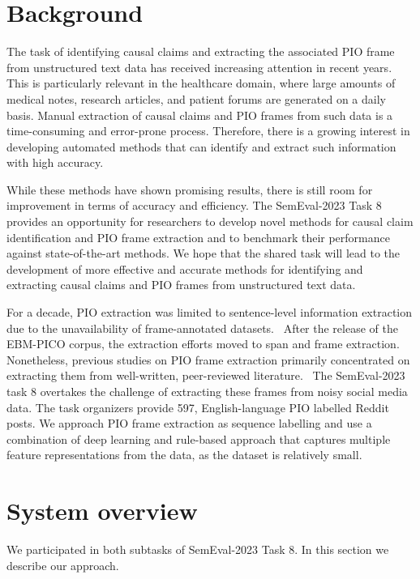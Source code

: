 \documentclass[11pt]{article}
\begin{document}
\section{Background}
\label{background}
%
The task of identifying causal claims and extracting the associated PIO frame from unstructured text data has received increasing attention in recent years.
This is particularly relevant in the healthcare domain, where large amounts of medical notes, research articles, and patient forums are generated on a daily basis.
Manual extraction of causal claims and PIO frames from such data is a time-consuming and error-prone process. Therefore, there is a growing interest in developing automated methods that can identify and extract such information with high accuracy.

While these methods have shown promising results, there is still room for improvement in terms of accuracy and efficiency.
The SemEval-2023 Task 8 provides an opportunity for researchers to develop novel methods for causal claim identification and PIO frame extraction and to benchmark their performance against state-of-the-art methods.
We hope that the shared task will lead to the development of more effective and accurate methods for identifying and extracting causal claims and PIO frames from unstructured text data.

For a decade, PIO extraction was limited to sentence-level information extraction due to the unavailability of frame-annotated datasets.~\cite{boudin2010combining,jin2018pico}
After the release of the EBM-PICO corpus, the extraction efforts moved to span and frame extraction.~\cite{nye2018corpus}
Nonetheless, previous studies on PIO frame extraction primarily concentrated on extracting them from well-written, peer-reviewed literature.~\cite{brockmeier2019improving,zhang2020unlocking,dhrangadhariya2021end}
The SemEval-2023 task 8 overtakes the challenge of extracting these frames from noisy social media data.
The task organizers provide 597, English-language PIO labelled Reddit posts.
We approach PIO frame extraction as sequence labelling and use a combination of deep learning and rule-based approach that captures multiple feature representations from the data, as the dataset is relatively small.
%
%
%
\section{System overview}
\label{system_over}
%
We participated in both subtasks of SemEval-2023 Task 8. 
In this section we describe our approach.
%
%
%
\end{document}
